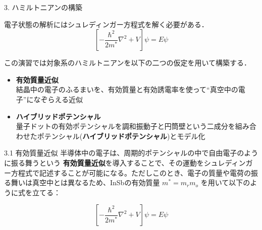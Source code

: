 \documentclass{beamer}
\begin{document}

\begin{frame}{3. ハミルトニアンの構築}

  電子状態の解析にはシュレディンガー方程式を解く必要がある．
  \begin{equation}
    \left[ -\frac{\hbar^2}{2 m^*} \nabla^2 + V \right] \psi = E \psi
  \end{equation}  
  
  この演習では対象系のハミルトニアンを以下の二つの仮定を用いて構築する．
  \begin{itemize}
    \item \textbf{有効質量近似}  \\
    \rightarrow 結晶中の電子のふるまいを、有効質量と有効誘電率を使って“真空中の電子”になぞらえる近似
    \item \textbf{ハイブリッドポテンシャル}  \\
    \rightarrow 量子ドットの有効ポテンシャルを調和振動子と円筒壁という二成分を組み合わせたポテンシャル(\textbf{ハイブリッドポテンシャル})とモデル化
  \end{itemize}
\end{frame}
  
\begin{frame}{3.1 有効質量近似}
  半導体中の電子は、周期的ポテンシャルの中で自由電子のように振る舞うという  \textbf{有効質量近似}を導入することで、その運動をシュレディンガー方程式で記述することが可能になる。ただしこのとき、電子の質量や電荷の振る舞いは真空中とは異なるため、InSbの有効質量 $m^*=m_rm_o$ を用いて以下のように式を立てる：
  
  \begin{equation}
    \left[ -\frac{\hbar^2}{2 m^*} \nabla^2 + V \right] \psi = E \psi
  \end{equation}
  

\end{frame}  
\end{document}

